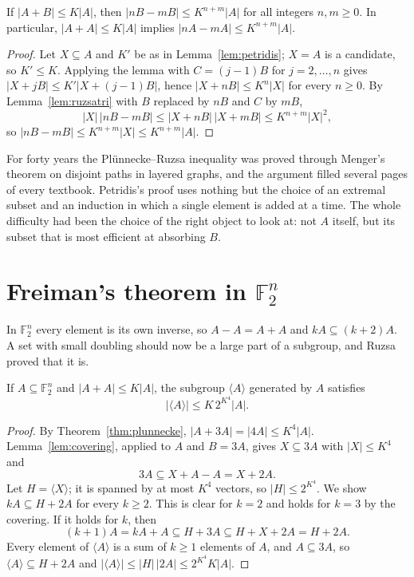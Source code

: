 \begin{theorem}\label{thm:plunnecke}
If $|A+B|\le K|A|$, then $|nB-mB|\le K^{n+m}|A|$ for all integers $n,m\ge0$. In particular, $|A+A|\le K|A|$ implies $|nA-mA|\le K^{n+m}|A|$.
\end{theorem}
\begin{proof}
Let $X\subseteq A$ and $K'$ be as in Lemma~\ref{lem:petridis}; $X=A$ is a candidate, so $K'\le K$. Applying the lemma with $C=(j-1)B$ for $j=2,\dots,n$ gives $|X+jB|\le K'|X+(j-1)B|$, hence $|X+nB|\le K^n|X|$ for every $n\ge0$. By Lemma~\ref{lem:ruzsatri} with $B$ replaced by $nB$ and $C$ by $mB$,
\[
|X|\,|nB-mB|\le|X+nB|\,|X+mB|\le K^{n+m}|X|^2,
\]
so $|nB-mB|\le K^{n+m}|X|\le K^{n+m}|A|$.
\end{proof}

\begin{beauty}
For forty years the Plünnecke--Ruzsa inequality was proved through Menger's theorem on disjoint paths in layered graphs, and the argument filled several pages of every textbook. Petridis's proof uses nothing but the choice of an extremal subset and an induction in which a single element is added at a time. The whole difficulty had been the choice of the right object to look at: not $A$ itself, but its subset that is most efficient at absorbing $B$.
\end{beauty}

\section{Freiman's theorem in \texorpdfstring{$\mathbb F_2^n$}{F2n}}\label{sec:freimanf2}

In $\mathbb F_2^n$ every element is its own inverse, so $A-A=A+A$ and $kA\subseteq(k+2)A$. A set with small doubling should now be a large part of a subgroup, and Ruzsa proved that it is.

\begin{theorem}[Ruzsa, 1999]\label{thm:ruzsaf2}
If $A\subseteq\mathbb F_2^n$ and $|A+A|\le K|A|$, the subgroup $\langle A\rangle$ generated by $A$ satisfies
\[
|\langle A\rangle|\le K\,2^{K^4}|A|.
\]
\end{theorem}
\begin{proof}
By Theorem~\ref{thm:plunnecke}, $|A+3A|=|4A|\le K^4|A|$. Lemma~\ref{lem:covering}, applied to $A$ and $B=3A$, gives $X\subseteq3A$ with $|X|\le K^4$ and
\[
3A\subseteq X+A-A=X+2A.
\]
Let $H=\langle X\rangle$; it is spanned by at most $K^4$ vectors, so $|H|\le2^{K^4}$. We show $kA\subseteq H+2A$ for every $k\ge2$. This is clear for $k=2$ and holds for $k=3$ by the covering. If it holds for $k$, then
\[
(k+1)A=kA+A\subseteq H+3A\subseteq H+X+2A=H+2A.
\]
Every element of $\langle A\rangle$ is a sum of $k\ge1$ elements of $A$, and $A\subseteq3A$, so $\langle A\rangle\subseteq H+2A$ and $|\langle A\rangle|\le|H|\,|2A|\le2^{K^4}K|A|$.
\end{proof}

